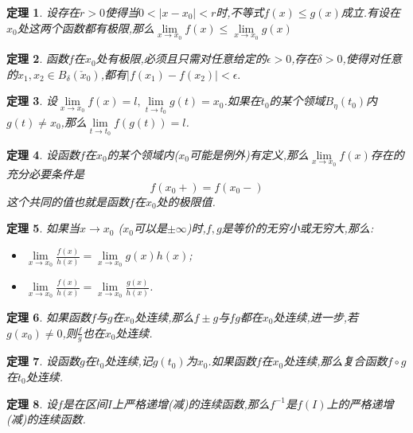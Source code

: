 \documentclass[UTF8]{ctexart}
\newtheorem{theorem}{定理}[section]
\begin{document}
\begin{theorem}
  设存在$r >0$使得当$0<|x-x_0|<r$时,不等式$f(x)\leq g(x)$成立.有设在$x_0$处这两个函数都有极限,那么$\lim\limits_{x \to x_0 }f(x)\leq \lim\limits_{x \to x_0 }g(x)$
\end{theorem}
\begin{theorem}
 函数$f$在$x_0$处有极限,必须且只需对任意给定的$\epsilon >0$,存在$\delta>0$,使得对任意的$x_1,x_2 \in B_{\delta}(\check x_{0})$,都有$|f(x_1)-f(x_2)|< \epsilon.$
\end{theorem}
\begin{theorem}
 设$\lim\limits_{x \to x_0 }f(x)=l,\lim\limits_{t \to t_0 }g(t)=x_0$.如果在$t_0$的某个领域$B_{\eta}(t_0)$内$g(t) \neq x_0$,那么$\lim\limits_{t \to t_0 }f(g(t))=l$.
\end{theorem}
\begin{theorem}
  设函数$f$在$x_0$的某个领域内($x_0$可能是例外)有定义,那么$\lim\limits_{x \to x_0 }f(x)$存在的充分必要条件是
  \[ f(x_0+)=f(x_0-) \]
  这个共同的值也就是函数$f$在$x_0$处的极限值.
\end{theorem}
\begin{theorem}
  如果当$x\rightarrow x_0$ ($x_0$可以是$\pm \infty$)时,$f,g$是等价的无穷小或无穷大,那么:
  
\begin{itemize}
\item $\lim\limits_{x \to x_0 }\frac{f(x)}{h(x)}=\lim\limits_{x \to x_0 }g(x)h(x)$;
\item $\lim\limits_{x \to x_0 }\frac{f(x)}{h(x)}=\lim\limits_{x \to x_0 }\frac{g(x)}{h(x)}$.
\end{itemize}
\end{theorem}
\begin{theorem}
 如果函数$f$与$g$在$x_0$处连续,那么$f \pm g$与$fg$都在$x_0$处连续,进一步,若$g(x_0) \neq 0$,则$\frac{f}{g}$也在$x_0$处连续.
\end{theorem}
\begin{theorem}
 设函数$g$在$t_0$处连续,记$g(t_0)$为$x_0$.如果函数$f$在$x_0$处连续,那么复合函数$f \circ g$在$t_0$处连续.
\end{theorem}
\begin{theorem}
 设$f$是在区间$I$上严格递增(减)的连续函数,那么$f^{-1}$是$f(I)$上的严格递增(减)的连续函数.
\end{theorem}
\end{document}
